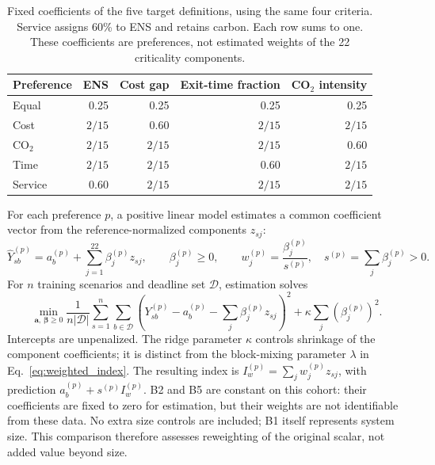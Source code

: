\begin{table}[htbp]\centering\small
\begin{tabular}{lrrrr}\toprule
Preference & ENS & Cost gap & Exit-time fraction & CO$_2$ intensity\\\midrule
Equal & 0.25 & 0.25 & 0.25 & 0.25\\
Cost & $2/15$ & 0.60 & $2/15$ & $2/15$\\
CO$_2$ & $2/15$ & $2/15$ & $2/15$ & 0.60\\
Time & $2/15$ & $2/15$ & 0.60 & $2/15$\\
Service & 0.60 & $2/15$ & $2/15$ & $2/15$\\\bottomrule
\end{tabular}
\caption{Fixed coefficients of the five target definitions, using the
same four criteria. Service assigns 60\% to ENS and retains carbon.
Each row sums to one. These coefficients are preferences, not estimated
weights of the 22 criticality components.}
\label{tab:p1_weight_preferences}
\end{table}

For each preference $p$, a positive linear model estimates a common
coefficient vector from the reference-normalized components $z_{sj}$:
\begin{equation}
 \widehat Y^{(p)}_{sb}=a^{(p)}_b+\sum_{j=1}^{22}\beta^{(p)}_jz_{sj},
 \qquad \beta^{(p)}_j\geq0,\qquad
 w^{(p)}_j=\frac{\beta^{(p)}_j}{s^{(p)}},\quad
 s^{(p)}=\sum_j\beta^{(p)}_j>0.
\label{eq:p1_learned_weights}
\end{equation}
For $n$ training scenarios and deadline set $\mathcal D$, estimation solves
\begin{equation}
 \min_{\boldsymbol a,\,\boldsymbol\beta\geq0}
 \frac{1}{n|\mathcal D|}\sum_{s=1}^{n}\sum_{b\in\mathcal D}
 \left(Y^{(p)}_{sb}-a_b^{(p)}-\sum_j\beta_j^{(p)}z_{sj}\right)^2
 +\kappa\sum_j(\beta_j^{(p)})^2.
 \label{eq:positive_ridge}
\end{equation}
Intercepts are unpenalized. The ridge parameter $\kappa$ controls shrinkage
of the component coefficients; it is distinct from the block-mixing
parameter $\lambda$ in Eq.~\eqref{eq:weighted_index}. The resulting index is
$I^{(p)}_w=\sum_jw^{(p)}_jz_{sj}$, with prediction
$a^{(p)}_b+s^{(p)}I^{(p)}_w$. B2 and B5 are constant on this cohort:
their coefficients are fixed to zero for estimation, but their
weights are not identifiable from these data. No extra size controls are included;
B1 itself represents system size. This comparison therefore assesses
reweighting of the original scalar, not added value beyond size.

